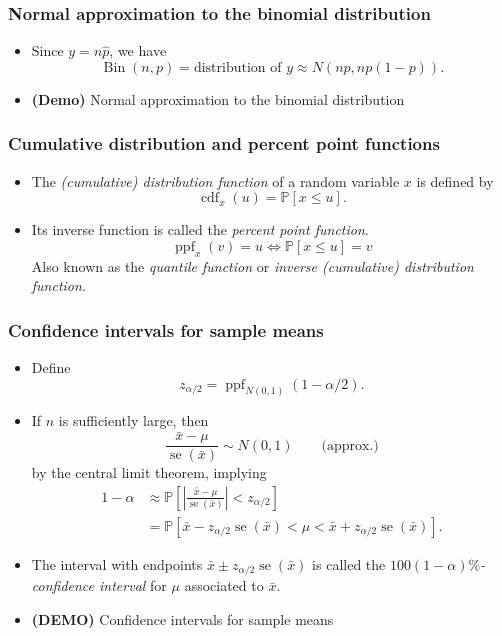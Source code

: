 \documentclass{beamer}
\DeclareMathOperator{\stderr}{se}
\DeclareMathOperator{\Bin}{Bin}
\DeclareMathOperator{\CDF}{cdf}
\DeclareMathOperator{\PPF}{ppf}
\begin{document}
\begin{frame}
    \frametitle{Normal approximation to the binomial distribution}
    
    \begin{itemize}
        \item Since $y=n\hat{p}$, we have
        \[
        \Bin(n, p) = \text{distribution of $y$}\approx
        N\left(np, np(1-p)\right).
        \]

        \item \textbf{(Demo)} Normal approximation to the binomial distribution
    \end{itemize}
\end{frame}

\begin{frame}
    \frametitle{Cumulative distribution and percent point functions}

    \begin{itemize}
        \item The \emph{(cumulative) distribution function} of a random variable $x$ is defined by
        \[
            \CDF_x(u) = \mathbb{P}[x\leq u].
        \]

        \item Its inverse function is called the \emph{percent point function}.
        \[
        \PPF_x(v) = u\Longleftrightarrow \mathbb{P}[x\leq u] = v 
        \]
        Also known as the \emph{quantile function} or \emph{inverse (cumulative) distribution function}.
    \end{itemize}    
\end{frame}

\begin{frame}
    \frametitle{Confidence intervals for sample means}

    \begin{itemize}
        \item Define
        \[
        z_{\alpha/2} = \PPF_{N(0, 1)}(1 - \alpha/2).
        \]

        \item If $n$ is sufficiently large, then
        \[
        \frac{\bar{x}-\mu}{\stderr(\bar{x})}\sim N(0,1)\qquad\text{(approx.)}
        \]
        by the central limit theorem, implying
        \begin{align*}
            1 - \alpha &\approx \mathbb{P}\left[\left|\frac{\bar{x} - \mu}{\stderr(\bar{x})}\right| < z_{\alpha/2}\right]\\
        &= \mathbb{P}[\bar{x} - z_{\alpha/2}\stderr(\bar{x}) < \mu < \bar{x} + z_{\alpha/2}\stderr(\bar{x})].
        \end{align*}

        \item The interval with endpoints $\bar{x} \pm z_{\alpha/2}\stderr(\bar{x})$ is called the
        \emph{$100(1-\alpha)\%$-confidence interval} for $\mu$ associated to $\bar{x}$.

        \item \textbf{(DEMO)} Confidence intervals for sample means
    \end{itemize}
\end{frame}
\end{document}
